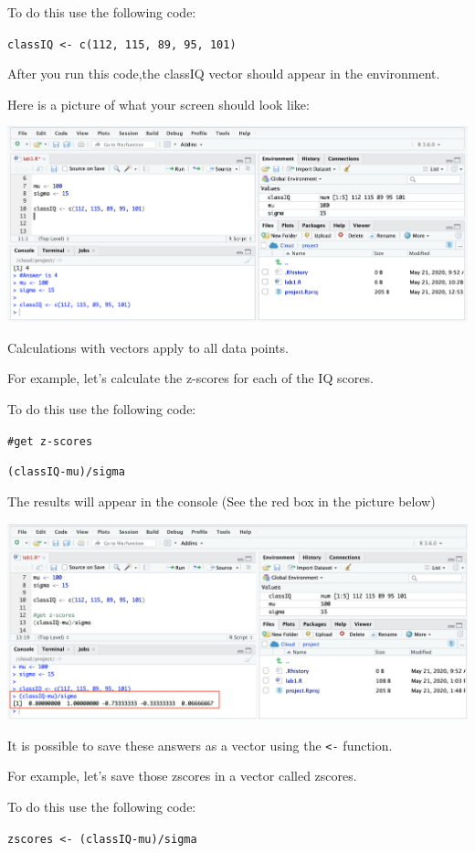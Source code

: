 \documentclass[
]{book}
\begin{document}
To do this use the following code:

\texttt{classIQ\ \textless{}-\ c(112,\ 115,\ 89,\ 95,\ 101)}

After you run this code,the classIQ vector should appear in the environment.

Here is a picture of what your screen should look like:

\includegraphics{img/vector.png}

Calculations with vectors apply to all data points.

For example, let's calculate the z-scores for each of the IQ scores.

To do this use the following code:

\texttt{\#get\ z-scores}

\texttt{(classIQ-mu)/sigma}

The results will appear in the console (See the red box in the picture below)

\includegraphics{img/zscores.png}

It is possible to save these answers as a vector using the \texttt{\textless{}-} function.

For example, let's save those zscores in a vector called zscores.

To do this use the following code:

\texttt{zscores\ \textless{}-\ (classIQ-mu)/sigma}
\end{document}
